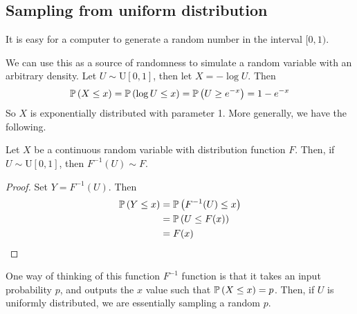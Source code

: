 \subsection{Sampling from uniform distribution}
It is easy for a computer to generate a random number in the interval \([0, 1)\).

We can use this as a source of randomness to simulate a random variable with an arbitrary density.
Let \(U \sim \mathrm{U}[0, 1]\), then let \(X = -\log U\).
Then
\[
	\mathbb{P}\left({X \leq x}\right) = \mathbb{P}\left({\log U \leq x}\right) = \mathbb{P}\left({U \geq e^{-x}}\right) = 1-e^{-x}
\]
So \(X\) is exponentially distributed with parameter 1.
More generally, we have the following.
\begin{theorem}
	Let \(X\) be a continuous random variable with distribution function \(F\).
	Then, if \(U \sim \mathrm{U}[0, 1]\), then \(F^{-1}(U) \sim F\).
\end{theorem}
\begin{proof}
	Set \(Y = F^{-1}(U)\).
	Then
	\begin{align*}
		\mathbb{P}\left({Y \leq x}\right) & = \mathbb{P}\left({F^{-1}(U) \leq x}\right) \\
		                & = \mathbb{P}\left({U \leq F(x)}\right)      \\
		                & = F(x)
	\end{align*}
\end{proof}
\noindent One way of thinking of this function \(F^{-1}\) function is that it takes an input probability \(p\), and outputs the \(x\) value such that \(\mathbb{P}\left({X \leq x}\right) = p\).
Then, if \(U\) is uniformly distributed, we are essentially sampling a random \(p\).

